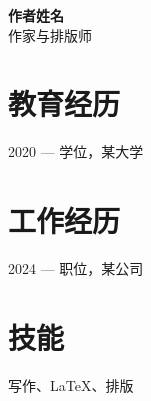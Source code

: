 \documentclass[11pt]{article}
\begin{document}
{\Large\bfseries 作者姓名}\\[4pt]
{\large 作家与排版师}

\vspace{8pt}

\section*{教育经历}
2020 — 学位，某大学

\section*{工作经历}
2024 — 职位，某公司

\section*{技能}
写作、LaTeX、排版
\end{document}
